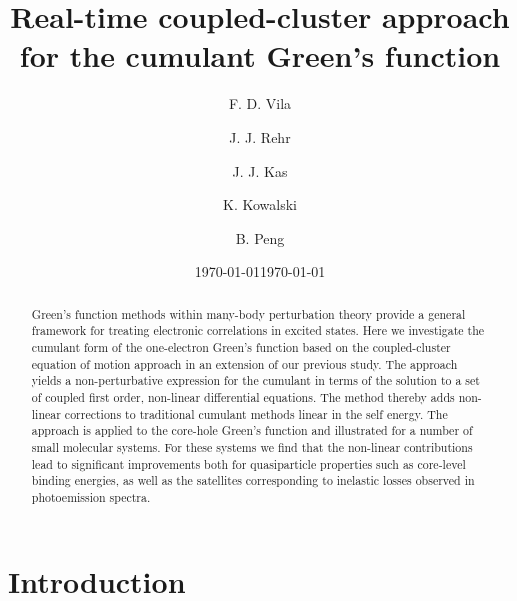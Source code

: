 \documentclass[aps,prb,twocolumn,groupaddress,floatfix]{revtex4}
\begin{document}
\title{Real-time coupled-cluster approach for the cumulant Green's function}
\date{\today}

\author{F. D. Vila}
\author{J. J. Rehr}
\author{J. J. Kas}
\author{K. Kowalski}
\author{B. Peng}

\begin{abstract} 

Green's function methods within many-body perturbation theory provide a
general framework for treating electronic correlations in excited states. 
Here we investigate the cumulant form of the one-electron Green's
function based on the coupled-cluster equation of motion approach in an
extension of our previous study. The approach yields a non-perturbative
expression for the cumulant in terms of the solution to a set of
coupled first order, non-linear differential equations. The method thereby
adds non-linear corrections to traditional cumulant methods linear in
the self energy.  The approach is applied to the core-hole Green's function 
and illustrated for a number of small molecular systems.
For these systems we find that the non-linear contributions lead to
significant improvements both for quasiparticle properties such as
core-level binding energies, as well as the satellites 
corresponding to inelastic losses observed in photoemission spectra.

\end{abstract}

\date{\today}

\maketitle

\section{Introduction}
\label{sec:intro}
\end{document}
